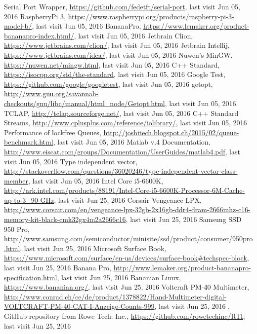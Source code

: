 \begin{thebibliography}{99}
Serial Port Wrapper, \url{https://github.com/fedetft/serial-port}, last visit Jun 05, 2016
RaspberryPi 3, \url{https://www.raspberrypi.org/products/raspberry-pi-3-model-b/}, last visit Jun 05, 2016
BananaPro, \url{https://www.lemaker.org/product-bananapro-index.html/}, last visit Jun 05, 2016
Jetbrain Clion, \url{https://www.jetbrains.com/clion/}, last visit Jun 05, 2016
 Jetbrain Intellij, \url{https://www.jetbrains.com/idea/}, last visit Jun 05, 2016
Nuwen's MinGW, \url{https://nuwen.net/mingw.html}, last visit Jun 05, 2016
C++ Standard, \url{https://isocpp.org/std/the-standard}, last visit Jun 05, 2016
Google Test, \url{https://github.com/google/googletest}, last visit Jun 05, 2016
getopt, \url{http://www.gnu.org/savannah-checkouts/gnu/libc/manual/html_node/Getopt.html}, last visit Jun 05, 2016
TCLAP, \url{http://tclap.sourceforge.net/}, last visit Jun 05, 2016
C++ Standard Streams, \url{http://www.cplusplus.com/reference/iolibrary/}, last visit Jun 05, 2016
 Performance of lockfree Queues, \url{http://joshitech.blogspot.ch/2015/02/queue-benchmark.html}, last visit Jun 05, 2016
 Matlab v.4 Documentation, \url{http://www.eiscat.com/groups/Documentation/UserGuides/matlab4.pdf}, last visit Jun 05, 2016
 Type independent vector, \url{http://stackoverflow.com/questions/36020246/type-independent-vector-class-member}, last visit Jun 05, 2016
 Intel Core i5-6600K, \url{http://ark.intel.com/products/88191/Intel-Core-i5-6600K-Processor-6M-Cache-up-to-3_90-GHz}, last visit Jun 25, 2016
 Corsair Vengeance LPX, \url{http://www.corsair.com/en/vengeance-lpx-32gb-2x16gb-ddr4-dram-2666mhz-c16-memory-kit-black-cmk32gx4m2a2666c16}, last visit Jun 25, 2016
 Samsung SSD 950 Pro, \url{http://www.samsung.com/semiconductor/minisite/ssd/product/consumer/950pro.html}, last visit Jun 25, 2016
 Microsoft Surface Book, \url{https://www.microsoft.com/surface/en-us/devices/surface-book#techspec-block}, last visit Jun 25, 2016
 Banana Pro, \url{http://www.lemaker.org/product-bananapro-specification.html}, last visit Jun 25, 2016
 Bananian Linux, \url{https://www.bananian.org/}, last visit Jun 25, 2016
 Voltcraft PM-40 Multimeter, \url{http://www.conrad.ch/ce/de/product/1378822/Hand-Multimeter-digital-VOLTCRAFT-PM-40-CAT-I-Anzeige-Counts-999}, last visit Jun 25, 2016
, GitHub repository from Rowe Tech. Inc., \url{https://github.com/rowetechinc/RTI}, last visit Jun 25, 2016
\end{thebibliography}

